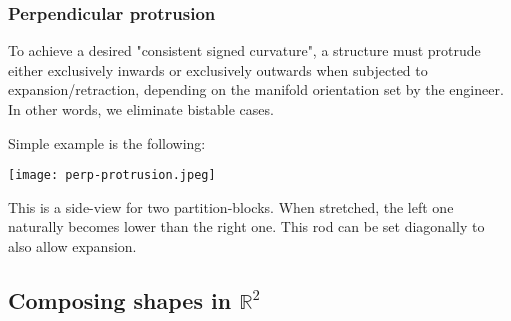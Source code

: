 \documentclass{article}
\begin{document}
\subsubsection{Perpendicular protrusion}
To achieve a desired "consistent signed curvature", a structure must protrude either exclusively inwards or exclusively outwards when subjected to expansion/retraction, depending on the manifold orientation set by the engineer. In other words, we eliminate bistable cases.

Simple example is the following:

\vspace{5mm}

\texttt{[image: perp-protrusion.jpeg]}

\vspace{5mm}

This is a side-view for two partition-blocks. When stretched, the left one naturally becomes lower than the right one. This rod can be set diagonally to also allow expansion.

\subsection{Composing shapes in $\mathbb{R}^2$}
\end{document}
